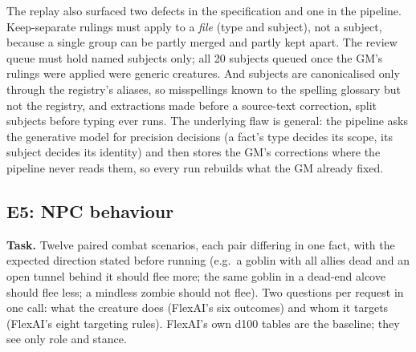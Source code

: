\documentclass[11pt]{article}
\begin{document}
\begin{table}[t]
\centering
\small
{}
\caption{E4, entity-level typing replayed on the \emph{monster} slice. $^\dagger$The remaining split is
one the GM ruled: a group whose \emph{npc} and \emph{monster} files were merged while its
\emph{faction} file was kept separate.}
\label{tab:e4r}
\end{table}

The replay also surfaced two defects in the specification and one in the pipeline. Keep-separate
rulings must apply to a \emph{file} (type and subject), not a subject, because a single group can be
partly merged and partly kept apart. The review queue must hold named subjects only; all 20 subjects
queued once the GM's rulings were applied were generic creatures. And subjects are canonicalised only
through the registry's aliases, so misspellings known to the spelling glossary but not the registry,
and extractions made before a source-text correction, split subjects before typing ever runs. The
underlying flaw is general: the pipeline asks the generative model for precision decisions (a fact's
type decides its scope, its subject decides its identity) and then stores the GM's corrections where
the pipeline never reads them, so every run rebuilds what the GM already fixed.

\subsection{E5: NPC behaviour}
\textbf{Task.} Twelve paired combat scenarios, each pair differing in one fact, with the expected
direction stated before running (e.g.\ a goblin with all allies dead and an open tunnel behind it
should flee more; the same goblin in a dead-end alcove should flee less; a mindless zombie should not
flee). Two questions per request in one call: what the creature does (FlexAI's six outcomes) and whom
it targets (FlexAI's eight targeting rules). FlexAI's own d100 tables are the baseline; they see only
role and stance.
\end{document}
